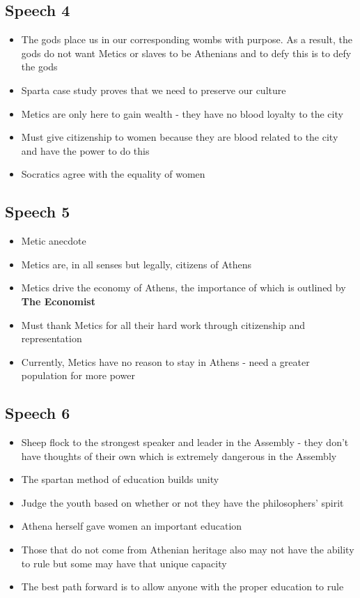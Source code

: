 \documentclass[11pt]{article}
\begin{document}
\subsection{Speech 4}
\label{sec:org4db1b48}
\begin{itemize}
\item The gods place us in our corresponding wombs with purpose. As a result, the gods do not want
Metics or slaves to be Athenians and to defy this is to defy the gods
\item Sparta case study proves that we need to preserve our culture
\item Metics are only here to gain wealth - they have no blood loyalty to the city
\item Must give citizenship to women because they are blood related to the city and have the power
to do this
\item Socratics agree with the equality of women
\end{itemize}
\subsection{Speech 5}
\label{sec:org7731dc5}
\begin{itemize}
\item Metic anecdote
\item Metics are, in all senses but legally, citizens of Athens
\item Metics drive the economy of Athens, the importance of which is outlined by \textbf{\textbf{The Economist}}
\item Must thank Metics for all their hard work through citizenship and representation
\item Currently, Metics have no reason to stay in Athens - need a greater population for more power
\end{itemize}
\subsection{Speech 6}
\label{sec:org802d5c1}
\begin{itemize}
\item Sheep flock to the strongest speaker and leader in the Assembly - they don't have thoughts of 
their own which is extremely dangerous in the Assembly
\item The spartan method of education builds unity
\item Judge the youth based on whether or not they have the philosophers' spirit
\item Athena herself gave women an important education
\item Those that do not come from Athenian heritage also may not have the ability to rule 
but some may have that unique capacity
\item The best path forward is to allow anyone with the proper education to rule
\end{itemize}
\end{document}

